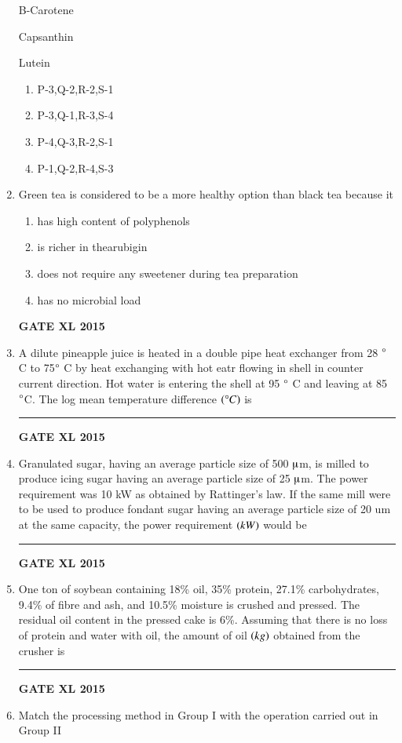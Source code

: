 \documentclass[journal,12pt,onecolumn]{IEEEtran}
\begin{document}
\begin{enumerate}
\begin{minipage}{0.5\textwidth}
\begin{flushleft}
 B-Carotene

 Capsanthin

 Lutein
	\end{flushleft}
	\end{minipage}
    \begin{enumerate}
            \item P-3,Q-2,R-2,S-1
            \item P-3,Q-1,R-3,S-4
            \item P-4,Q-3,R-2,S-1
            \item P-1,Q-2,R-4,S-3
    \end{enumerate}
\item  Green tea is considered to be a more healthy option than black tea because it
    \begin{enumerate}
            \item  has high content of polyphenols
	    \item is richer in thearubigin
	    \item {does not require any sweetener during tea preparation}
	    \item {has no microbial load}
    \end{enumerate}
\begin{flushright}\textbf{GATE XL 2015}\end{flushright}
\item  A dilute pineapple juice is heated in a double pipe heat exchanger from 28 $\degree$ C to 75$\degree$ C by heat exchanging with hot eatr flowing in shell in counter current direction. Hot water is entering the shell at 95 $\degree$ C and leaving at 85 $\degree$C. The log mean temperature difference $\left(\degree C\right)$ is \rule{1cm}{0.15mm}
\begin{flushright}\textbf{GATE XL 2015}\end{flushright}
\item  Granulated sugar, having an average particle size of 500 $\micro$m, is milled to produce icing sugar having an average particle size of 25 $\micro$m. The power requirement was 10 kW as obtained by Rattinger's law. If the same mill were to be used to produce fondant sugar having an average particle size of 20 um at the same capacity, the power requirement $\left(kW\right)$ would be \rule{1cm}{0.15mm}
    
\begin{flushright}\textbf{GATE XL 2015}\end{flushright}

\item One ton of soybean containing 18\% oil, 35\% protein, 27.1\% carbohydrates, 9.4\% of fibre and ash, and 10.5\% moisture is crushed and pressed. The residual oil content in the pressed cake is 6\%. Assuming that there is no loss of protein and water with oil, the amount of oil $\left(kg\right)$ obtained from the crusher is \rule{1cm}{0.15mm}
\begin{flushright}\textbf{GATE XL 2015}\end{flushright}
\item  Match the processing method in Group I with the operation carried out in Group II


\end{enumerate}
\end{document}
